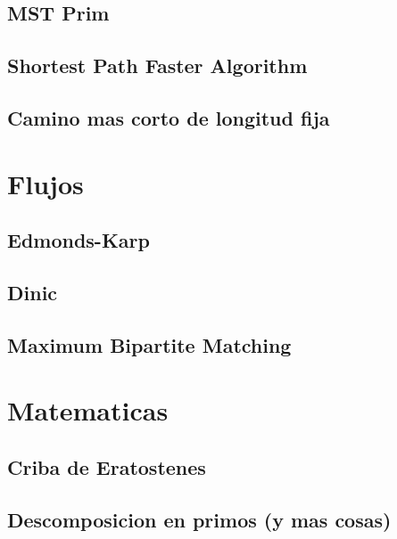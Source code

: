 \subsection{MST Prim}
\raggedbottom
\hrulefill
\subsection{Shortest Path Faster Algorithm}
\raggedbottom
\hrulefill
\subsection{Camino mas corto de longitud fija}
\raggedbottom
\hrulefill

\section{Flujos}
\subsection{Edmonds-Karp}
\raggedbottom
\hrulefill
\subsection{Dinic}
\raggedbottom
\hrulefill
\subsection{Maximum Bipartite Matching}
\raggedbottom
\hrulefill

\section{Matematicas}
\subsection{Criba de Eratostenes}
\raggedbottom
\hrulefill
\subsection{Descomposicion en primos (y mas cosas)}
\raggedbottom
\hrulefill
